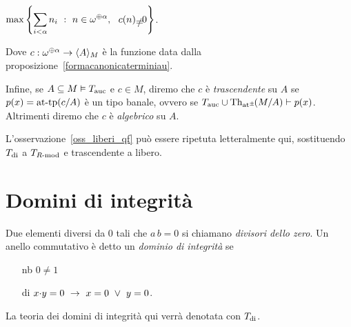 \hfil$\displaystyle\max\Bigg\{\smash{\sum_{i<\alpha}n_i}\ :\ n\in\omega^{\oplus\alpha},\ \ c(n)\neq0\Bigg\}$.

Dove $c:\omega^{\oplus\alpha}\to\<A\>_M$ \`e la funzione data dalla proposizione~\ref{formacanonicaterminiau}. 

Infine, se $A\subseteq M\models T_{\rm auc}$ e $c\in M$, diremo che $c$ \`e \emph{trascendente\/} su $A$ se $p(x)=\atp(c/A)$ \`e un tipo banale, ovvero se $T_{\rm auc}\cup\Diag(M/A)\proves p(x)$. Altrimenti diremo che $c$ \`e \emph{algebrico\/} su $A$. 



\begin{remark}\label{oss_trascendenti_qf}
L'osservazione~\ref{oss_liberi_qf} pu\`o essere ripetuta letteralmente qui, sostituendo $T_{\rm di}$ a $T_\Rmod$ e trascendente a libero.\QED 
\end{remark}
% 
% 
% 
% 
% 
% 
% 

\section{Domini di integrit\`a}

Due elementi diversi da $0$ tali che $a\,b=0$ si chiamano \emph{divisori dello zero}. Un anello commutativo \`e detto un \emph{dominio di integrit\`a} se  
\begin{itemize}
\item[nb] $0\neq 1$
\item[di] $x\mdot y =0\ \imp\ x=0\ \vee\ y=0$.
\end{itemize}
La teoria dei domini di integrit\`a qui verr\`a denotata con \emph{$T_{\rm di}$}. 

